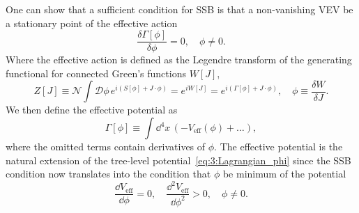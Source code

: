 One can show that a sufficient condition for \acs{SSB} is that a non-vanishing \acs{VEV} be a stationary point of the effective action
\begin{equation}
\frac{\delta \Gamma [\phi]}{\delta \phi} = 0, \quad \phi \neq 0.
\label{eq:3:SSB_condition}
\end{equation}
Where the effective action is defined as the Legendre transform of the generating functional for connected Green's functions $W[J]$, \ie
\begin{equation}
Z[J] \equiv \mathcal{N} \int \mathcal{D} \phi \, e^{i (S[\phi] + J \cdot \phi)} = e^{i W[J]} = e^{i (\Gamma[\phi] + J \cdot \phi)}, \quad \phi \equiv \frac{\delta W}{\delta J}.
\end{equation}
We then define the effective potential as
\begin{equation}
\Gamma [\phi] \equiv \int \dd^4 x\, \left(-V_{\text{eff}}(\phi) + \ldots \right),
\label{eq:3:Veff}
\end{equation}
where the omitted terms contain derivatives of $\phi$. The effective potential is the natural extension of the tree-level potential~\eqref{eq:3:Lagrangian_phi} since the \acs{SSB} condition now translates into the condition that $\phi$ be minimum of the potential
\begin{equation}
\frac{\dd V_\text{eff}}{\dd \phi} = 0, \quad \frac{\dd^2 V_\text{eff}}{\dd \phi^2} > 0, \quad \phi \neq 0.
\end{equation}

